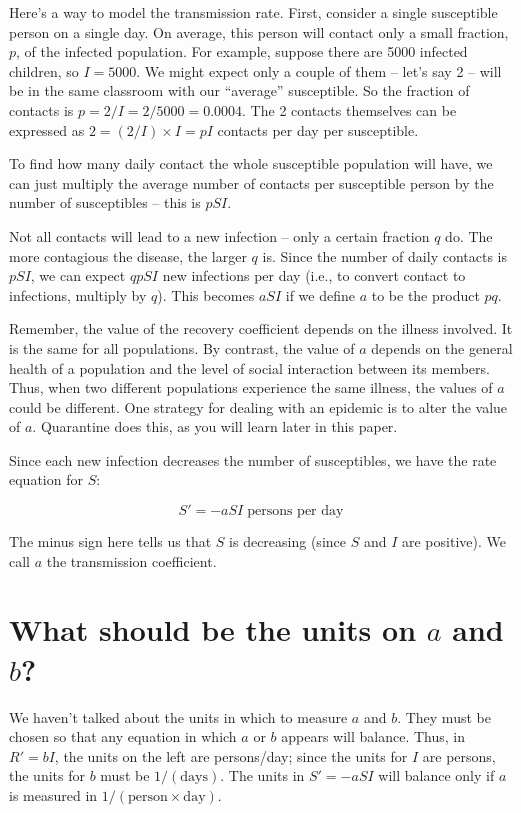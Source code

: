 \documentclass
[justified,nohyper]
{tufte-handout}
\begin{document}
Here's a way to model the transmission rate. First, consider a single susceptible person on a single day. On average, this person will contact only a small fraction, $p$, of the infected population. For example, suppose there are 5000 infected children, so $I=5000$. We might expect only a couple of them -- let's say 2 -- will be in the same classroom with our ``average'' susceptible. So the fraction of contacts is $p=2/I = 2/5000= 0.0004$. The 2 contacts themselves can be expressed as $2=(2/I) \times I = pI$ contacts per day per susceptible.

To find how many daily contact the whole susceptible population will have, we can just multiply the average number of contacts per susceptible person by the number of susceptibles -- this is $pSI$.

Not all contacts will lead to a new infection -- only a certain fraction $q$ do. The more contagious the disease, the larger $q$ is. Since the number of daily contacts is $pSI$, we can expect $qpSI$ new infections per day (i.e., to convert contact to infections, multiply by $q$). This becomes $aSI$ if we define $a$ to be the product $pq$.

Remember, the value of the recovery coefficient depends on the illness involved. It is the same for all populations. By contrast, the value of $a$ depends on the general health of a population and the level of social interaction between its members. Thus, when two different populations experience the same illness, the values of $a$ could be different. One strategy for dealing with an epidemic is to alter the value of $a$. Quarantine does this, as you will learn later in this paper.

Since each new infection decreases the number of susceptibles, we have the rate equation for $S$:

\[
	S' = -aSI\;\text{persons per day}
\]

The minus sign here tells us that $S$ is decreasing (since $S$ and $I$ are positive). We call $a$ the transmission coefficient.

\section{What should be the units on $a$ and $b$?}
We haven't talked about the units in which to measure $a$ and $b$. They must be chosen so that any equation in which $a$ or $b$ appears will balance. Thus, in $R'=bI$, the units on the left are persons/day; since the units for $I$ are persons, the units for $b$ must be $1/(\text{days})$. The units in $S'=-aSI$ will balance only if $a$ is measured in $1/(\text{person}\times\text{day})$.
\end{document}
